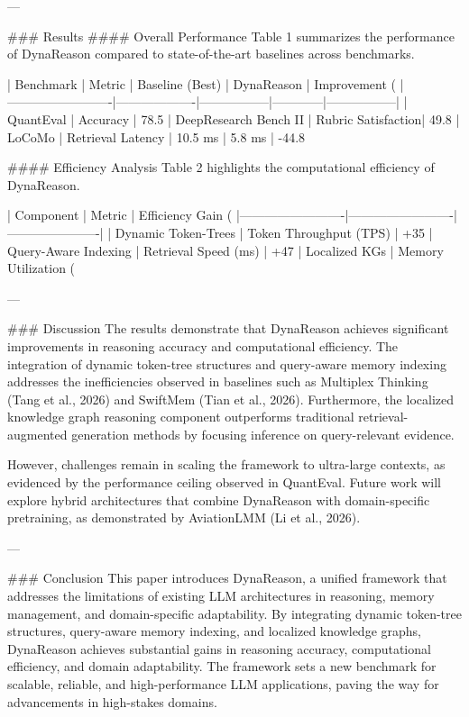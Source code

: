 ---

### Results  
#### Overall Performance  
Table 1 summarizes the performance of DynaReason compared to state-of-the-art baselines across benchmarks.

| Benchmark              | Metric            | Baseline (Best) | DynaReason | Improvement (%
|-------------------------|-------------------|-----------------|------------|-----------------|
| QuantEval              | Accuracy          | 78.5%
| DeepResearch Bench II  | Rubric Satisfaction| 49.8%
| LoCoMo                 | Retrieval Latency | 10.5 ms         | 5.8 ms     | -44.8%

#### Efficiency Analysis  
Table 2 highlights the computational efficiency of DynaReason.

| Component              | Metric                  | Efficiency Gain (%
|-------------------------|-------------------------|----------------------|
| Dynamic Token-Trees    | Token Throughput (TPS)  | +35%
| Query-Aware Indexing   | Retrieval Speed (ms)    | +47%
| Localized KGs          | Memory Utilization (%

---

### Discussion  
The results demonstrate that DynaReason achieves significant improvements in reasoning accuracy and computational efficiency. The integration of dynamic token-tree structures and query-aware memory indexing addresses the inefficiencies observed in baselines such as Multiplex Thinking (Tang et al., 2026) and SwiftMem (Tian et al., 2026). Furthermore, the localized knowledge graph reasoning component outperforms traditional retrieval-augmented generation methods by focusing inference on query-relevant evidence.  

However, challenges remain in scaling the framework to ultra-large contexts, as evidenced by the performance ceiling observed in QuantEval. Future work will explore hybrid architectures that combine DynaReason with domain-specific pretraining, as demonstrated by AviationLMM (Li et al., 2026).

---

### Conclusion  
This paper introduces DynaReason, a unified framework that addresses the limitations of existing LLM architectures in reasoning, memory management, and domain-specific adaptability. By integrating dynamic token-tree structures, query-aware memory indexing, and localized knowledge graphs, DynaReason achieves substantial gains in reasoning accuracy, computational efficiency, and domain adaptability. The framework sets a new benchmark for scalable, reliable, and high-performance LLM applications, paving the way for advancements in high-stakes domains.

